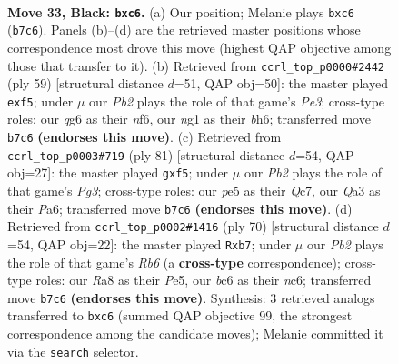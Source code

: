\documentclass[11pt]{article}
\begin{document}
\clearpage

\begin{figure}[p]\centering
\begin{subfigure}{0.46\textwidth}\centering
\resizebox{\linewidth}{!}{%
\newchessgame
\chessboard[
  setfen={r1b5/1p2k3/2B1p1Q1/p3P3/P4P2/q7/4K3/6N1 b - - 0 33},
  showmover=false,
  pgfstyle=straightmove, color=movearrow, markmove={b7-c6}
]}
\caption{}
\end{subfigure}\hfill
\begin{subfigure}{0.46\textwidth}\centering
\resizebox{\linewidth}{!}{%
\newchessgame
\chessboard[
  setfen={2b4k/r4p2/p3pN1B/1p2PB1P/8/8/P2K2P1/8 b - - 0 30},
  showmover=false,
  pgfstyle=straightmove, color=movearrow, markmove={e6-f5}
]}
\caption{}
\end{subfigure}
\\[4pt]
\begin{subfigure}{0.46\textwidth}\centering
\resizebox{\linewidth}{!}{%
\newchessgame
\chessboard[
  setfen={6k1/2q2b2/p5pQ/1pr2N2/6P1/5p1P/P4P2/4R1K1 b - - 5 41},
  showmover=false,
  pgfstyle=straightmove, color=movearrow, markmove={g6-f5}
]}
\caption{}
\end{subfigure}\hfill
\begin{subfigure}{0.46\textwidth}\centering
\resizebox{\linewidth}{!}{%
\newchessgame
\chessboard[
  setfen={r5k1/1p4p1/1Rn5/3pP2p/7P/1P6/4QBK1/2q5 w - - 0 36},
  showmover=false,
  pgfstyle=straightmove, color=movearrow, markmove={b6-b7}
]}
\caption{}
\end{subfigure}
\caption{\textbf{Move 33, Black: \texttt{bxc6}.} (a) Our position; Melanie plays \texttt{bxc6} (\texttt{b7c6}). Panels (b)--(d) are the retrieved master positions whose correspondence most drove this move (highest QAP objective among those that transfer to it). (b) Retrieved from \texttt{ccrl\_top\_p0000\#2442} (ply 59) [structural distance $d$=51, QAP obj=50]: the master played \texttt{exf5}; under $\mu$ our \emph{Pb2} plays the role of that game's \emph{Pe3}; cross-type roles: our \emph{q}g6 as their \emph{n}f6, our \emph{n}g1 as their \emph{b}h6; transferred move \texttt{b7c6} \textbf{(endorses this move)}. (c) Retrieved from \texttt{ccrl\_top\_p0003\#719} (ply 81) [structural distance $d$=54, QAP obj=27]: the master played \texttt{gxf5}; under $\mu$ our \emph{Pb2} plays the role of that game's \emph{Pg3}; cross-type roles: our \emph{p}e5 as their \emph{Q}c7, our \emph{Q}a3 as their \emph{P}a6; transferred move \texttt{b7c6} \textbf{(endorses this move)}. (d) Retrieved from \texttt{ccrl\_top\_p0002\#1416} (ply 70) [structural distance $d$=54, QAP obj=22]: the master played \texttt{Rxb7}; under $\mu$ our \emph{Pb2} plays the role of that game's \emph{Rb6} (a \textbf{cross-type} correspondence); cross-type roles: our \emph{R}a8 as their \emph{P}e5, our \emph{b}c6 as their \emph{n}c6; transferred move \texttt{b7c6} \textbf{(endorses this move)}. Synthesis: 3 retrieved analogs transferred to \texttt{bxc6} (summed QAP objective 99, the strongest correspondence among the candidate moves); Melanie committed it via the \texttt{search} selector.}
\label{fig:thought-m65}
\end{figure}
\end{document}
